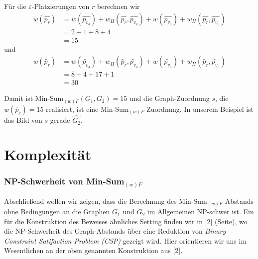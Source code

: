 \documentclass[a4paper, 12pt, twoside]{article}
\theoremstyle{Format1} %
\begin{document}
Für die $\varepsilon$-Platzierungen von $r$ berechnen wir
\begin{equation} \label{min_sum_weight_root_hat}
	\begin{split}
		w(\widehat{p_{r}}) & = w(\widehat{p_{v_4}}) + w_H(\widehat{p_{r}}, \widehat{p_{v_4}}) + w(\widehat{p_{v_6}}) + w_H(\widehat{p_{r}}, \widehat{p_{v_6}}) \\
		& = 2 + 1 + 8 + 4 \\
		& = 15
	\end{split}
\end{equation}
und
\begin{equation} \label{min_sum_weight_root_tilde}
	\begin{split}
		w(\widetilde{p_{r}}) & = w(\widetilde{p_{v_4}}) + w_H(\widetilde{p_{r}}, \widetilde{p_{v_4}}) + w(\widetilde{p_{v_6}}) + w_H(\widetilde{p_{r}}, \widetilde{p_{v_6}}) \\
		& = 8 + 4 + 17 + 1 \\
		& = 30
	\end{split}
\end{equation}

Damit ist Min-Sum$_{(w)F}(G_1,G_2) = 15$ und die Graph-Zuordnung $s$, die $w(\widetilde{p_{r}}) = 15$ realisiert, ist eine Min-Sum$_{(w)F}$ Zuordnung.
In unserem Beispiel ist das Bild von $s$ gerade $\widehat{G_2}$.

\newpage
\section{Komplexität} \label{Kapitel 4}

\subsubsection{NP-Schwerheit von Min-Sum$_{(w)F}$}

Abschließend wollen wir zeigen, dass die Berechnung des Min-Sum$_{(w)F}$ Abstands ohne Bedingungen an die Graphen $G_1$ und $G_2$ im Allgemeinen
NP-schwer ist. Ein für die Konstruktion des Beweises ähnliches Setting finden wir in [2] (Seite), wo die NP-Schwerheit des Graph-Abstands
über eine Reduktion von \textit{Binary Constraint Satifaction Problem (CSP)} gezeigt wird.
Hier orientieren wir uns im Wesentlichen an der oben genannten Konstruktion aus [2].
\end{document}
